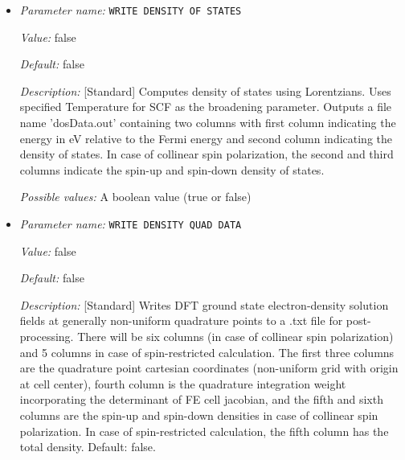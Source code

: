 \begin{itemize}
{\it Value:} false


{\it Default:} false


{\it Description:} [Standard] Writes DFT ground state electron-density solution fields (FEM mesh nodal values) to densityOutput.vtu file for visualization purposes. The electron-density solution field in densityOutput.vtu is named density. In case of spin-polarized calculation, two additional solution fields- density\_0 and density\_1 are also written where 0 and 1 denote the spin indices. In the case of geometry optimization, the electron-density corresponding to the last ground-state solve is written. Default: false.


{\it Possible values:} A boolean value (true or false)
\item {\it Parameter name:} {\tt WRITE DENSITY OF STATES}
\label{parameters:Post_2dprocessing Options/WRITE DENSITY OF STATES}
\label{parameters:Post_2dprocessing_20Options/WRITE_20DENSITY_20OF_20STATES}


{\it Value:} false


{\it Default:} false


{\it Description:} [Standard] Computes density of states using Lorentzians. Uses specified Temperature for SCF as the broadening parameter. Outputs a file name 'dosData.out' containing two columns with first column indicating the energy in eV relative to the Fermi energy and second column indicating the density of states. In case of collinear spin polarization, the second and third columns indicate the spin-up and spin-down density of states.


{\it Possible values:} A boolean value (true or false)
\item {\it Parameter name:} {\tt WRITE DENSITY QUAD DATA}
\label{parameters:Post_2dprocessing Options/WRITE DENSITY QUAD DATA}
\label{parameters:Post_2dprocessing_20Options/WRITE_20DENSITY_20QUAD_20DATA}


{\it Value:} false


{\it Default:} false


{\it Description:} [Standard] Writes DFT ground state electron-density solution fields at generally non-uniform quadrature points to a .txt file for post-processing. There will be six columns (in case of collinear spin polarization) and 5 columns in case of spin-restricted calculation. The first three columns are the quadrature point cartesian coordinates (non-uniform grid with origin at cell center), fourth column is the quadrature integration weight incorporating the determinant of FE cell jacobian, and the fifth and sixth columns are the spin-up and spin-down densities in case of collinear spin polarization. In case of spin-restricted calculation, the fifth column has the total density. Default: false.



\end{itemize}
